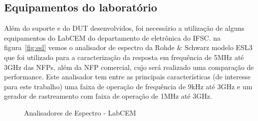 \subsection{Equipamentos do laboratório}
Além do suporte e do DUT desenvolvidos, foi necessário a utilização de alguns equipamentos do LabCEM do departamento de eletrônica do IFSC. na figura~\ref{fig:esl} vemos o analisador de espectro da Rohde \& Schwarz modelo ESL3 que foi utilizado para a caracterização da resposta em frequência de 5MHz até 3GHz das NFPs, além da NFP comercial, cujo será realizado uma comparação de performance. Este analisador tem entre as principais características (de interesse para este trabalho) uma faixa de operação de frequência de 9kHz até 3GHz e um gerador de rastreamento com faixa de operação de 1MHz até 3GHz.

\begin{figure}[htb!]
	\centering
 	\caption{Analisadores de Espectro - LabCEM}
\end{figure}

